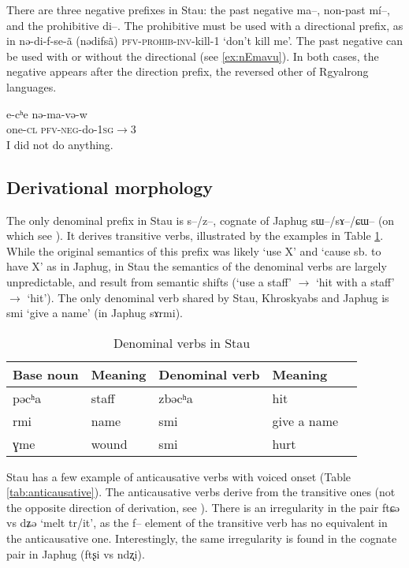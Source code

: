 \documentclass[oneside,a4paper,11pt]{article}
\newcommand{\ipa}[1]{{\phon #1}} %
\begin{document}
There are three negative prefixes in Stau: the past negative \ipa{ma--}, non-past \ipa{mí--}, and the prohibitive \ipa{di--}. The prohibitive must be used with a directional prefix, as in   \ipa{nə-di-f-se-ã}  (\ipa{nədifsã}) \textsc{pfv-prohib-inv}-kill-1 `don't kill me'. The past negative can be used with or without the directional (see \ref{ex:nEmavu}). In both cases, the negative appears after the direction prefix, the reversed other of Rgyalrong languages.


\begin{exe}
\ex \label{ex:nEmavu} 
\gll
\ipa{e-cʰe} 	\ipa{nə-ma-və-w}  \\
one-\textsc{cl} \textsc{pfv-neg}-do-\textsc{1sg}$\rightarrow$3 \\
\glt I did not do anything.
\end{exe}


 \subsection{Derivational morphology}
 
The only denominal prefix in Stau is \ipa{s--/z--}, cognate of Japhug \ipa{sɯ--/sɤ--/ɕɯ--} (on which see \citealt[14-17]{jacques14antipassive}). It derives transitive verbs, illustrated by the examples in Table \ref{tab:denominal}. While the original semantics of this prefix was likely `use X' and `cause sb. to have X' as in Japhug, in Stau the semantics of the denominal verbs are largely unpredictable, and result from semantic shifts (`use a staff' $\rightarrow$ `hit with a staff' $\rightarrow$  `hit'). The only denominal verb shared by Stau, Khroskyabs and Japhug is \ipa{smi} `give a name' (in Japhug \ipa{sɤrmi}).
 
 \begin{table}[H]
 \caption{Denominal verbs in Stau} \label{tab:denominal} \centering 
\begin{tabular}{lllll}
\toprule
Base noun & Meaning & Denominal verb & Meaning \\
\midrule
\ipa{pəcʰa} & staff&\ipa{zbəcʰa} & hit \\
\ipa{rmi} &name &\ipa{smi} &give a name \\
\ipa{ɣme} &wound &\ipa{smi} & hurt \\
\bottomrule
\end{tabular}
\end{table}
 
 
 Stau has a few example of anticausative verbs with voiced onset (Table \ref{tab:anticausative}). The anticausative verbs derive from the transitive ones (not the opposite direction of derivation, see \citealt{jacques12demotion}). There is an irregularity in the pair \ipa{ftɕə} vs \ipa{dʑə} `melt tr/it', as the \ipa{f--} element of the transitive verb has no equivalent in the anticausative one. Interestingly, the same irregularity is found in the cognate pair in Japhug (\ipa{ftʂi} vs \ipa{ndʐi}).
 
\end{document}
